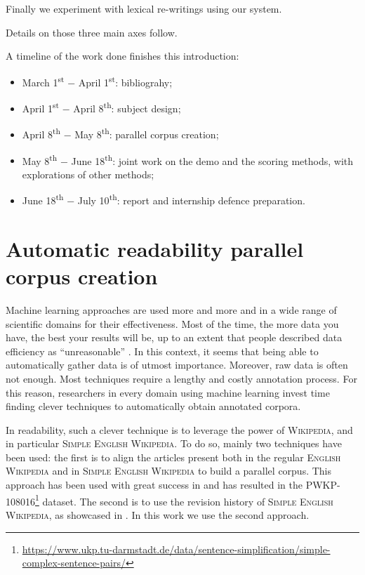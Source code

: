 \documentclass[a4paper, 11pt, onepage]{scrreprt}
\newcommand\wiki{\textsc{Wikipedia}}
\newcommand\ew{\textsc{English Wikipedia}}
\newcommand\sew{\textsc{Simple English Wikipedia}}
\begin{document}
Finally we experiment with lexical re-writings using our system.

Details on those three main axes follow.

A timeline of the work done finishes this introduction:

\begin{itemize}
\item March 1\textsuperscript{st} − April 1\textsuperscript{st}:
  bibliograhy;
\item April 1\textsuperscript{st} − April 8\textsuperscript{th}:
  subject design;
\item April 8\textsuperscript{th} − May 8\textsuperscript{th}:
  parallel corpus creation;
\item May 8\textsuperscript{th} − June 18\textsuperscript{th}:
  joint work on the demo and the scoring methods, with explorations of
  other methods;
\item June 18\textsuperscript{th} − July 10\textsuperscript{th}:
  report and internship defence preparation.
\end{itemize}

\section{Automatic readability parallel corpus creation}
\label{sec:corpus}

Machine learning approaches are used more and more and in a wide range
of scientific domains for their effectiveness. Most of the time, the
more data you have, the best your results will be, up to an extent
that people described data efficiency as “unreasonable”
\cite{halevy2009unreasonable}. In this context, it seems that being
able to automatically gather data is of utmost importance. Moreover,
raw data is often not enough. Most techniques require a lengthy and
costly annotation process. For this reason, researchers in every
domain using machine learning invest time finding clever techniques to
automatically obtain annotated corpora.

In readability, such a clever technique is to leverage the power of
\wiki, and in particular \sew. To do so, mainly two techniques have
been used: the first is to align the articles present both in the
regular \ew{} and in \sew{} to build a parallel corpus. This approach
has been used with great success in
\cite{zhu-bernhard-gurevych:2010:PAPERS} and has resulted in the
PWKP-108016\footnote{\url{https://www.ukp.tu-darmstadt.de/data/sentence-simplification/simple-complex-sentence-pairs/}}
dataset. The second is to use the revision history of \sew, as
showcased in \cite{yatskar2010sake}. In this work we use the second
approach.
\end{document}
